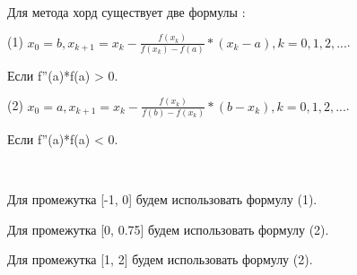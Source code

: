 \documentclass[]{article}
\begin{document}
~

Для метода хорд существует две формулы :

(1) $x_0 = b, x_{k+1} = x_k - \frac{f(x_k)}{f(x_k) - f(a)} * (x_k - a), k=0,1,2,...$.

Если f''(a)*f(a) > 0.

(2) $x_0 = a, x_{k+1} = x_k - \frac{f(x_k)}{f(b) - f(x_k)} * (b - x_k), k=0,1,2,...$.

Если f''(a)*f(a) < 0.

~

Для промежутка [-1, 0] будем использовать формулу (1).

Для промежутка [0, 0.75] будем использовать формулу (2).

Для промежутка [1, 2] будем использовать формулу (2).

~
\end{document}
